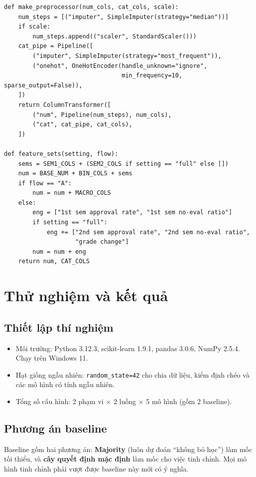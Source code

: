 \documentclass[12pt,a4paper]{article}
\begin{document}
\begin{lstlisting}[caption={Xây dựng pipeline tiền xử lý và chọn cột theo luồng}]
def make_preprocessor(num_cols, cat_cols, scale):
    num_steps = [("imputer", SimpleImputer(strategy="median"))]
    if scale:
        num_steps.append(("scaler", StandardScaler()))
    cat_pipe = Pipeline([
        ("imputer", SimpleImputer(strategy="most_frequent")),
        ("onehot", OneHotEncoder(handle_unknown="ignore",
                                 min_frequency=10, sparse_output=False)),
    ])
    return ColumnTransformer([
        ("num", Pipeline(num_steps), num_cols),
        ("cat", cat_pipe, cat_cols),
    ])

def feature_sets(setting, flow):
    sems = SEM1_COLS + (SEM2_COLS if setting == "full" else [])
    num = BASE_NUM + BIN_COLS + sems
    if flow == "A":
        num = num + MACRO_COLS
    else:
        eng = ["1st sem approval rate", "1st sem no-eval ratio"]
        if setting == "full":
            eng += ["2nd sem approval rate", "2nd sem no-eval ratio",
                    "grade change"]
        num = num + eng
    return num, CAT_COLS
\end{lstlisting}

\section{Thử nghiệm và kết quả}

\subsection{Thiết lập thí nghiệm}
\begin{itemize}
  \item Môi trường: Python 3.12.3, scikit-learn 1.9.1, pandas 3.0.6, NumPy 2.5.4. Chạy trên Windows 11.
  \item Hạt giống ngẫu nhiên: \texttt{random\_state=42} cho chia dữ liệu, kiểm định chéo và các mô hình có tính ngẫu nhiên.
  \item Tổng số cấu hình: 2 phạm vi $\times$ 2 luồng $\times$ 5 mô hình (gồm 2 baseline).
\end{itemize}

\subsection{Phương án baseline}
Baseline gồm hai phương án: \textbf{Majority} (luôn dự đoán ``không bỏ học'') làm mốc tối thiểu, và \textbf{cây quyết định mặc định} làm mốc cho việc tinh chỉnh. Mọi mô hình tinh chỉnh phải vượt được baseline này mới có ý nghĩa.
\end{document}
